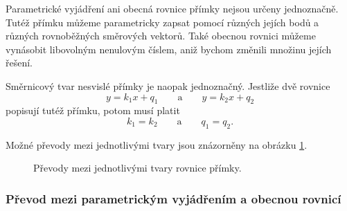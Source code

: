 \begin{remark}\label{rem:Uniqueness_line_forms}
    Parametrické vyjádření ani obecná rovnice přímky nejsou určeny
    jednoznačně. Tutéž přímku můžeme parametricky zapsat pomocí různých
    jejích bodů a různých rovnoběžných směrových vektorů. Také obecnou
    rovnici můžeme vynásobit libovolným nenulovým číslem, aniž bychom
    změnili množinu jejích řešení.

    Směrnicový tvar nesvislé přímky je naopak jednoznačný. Jestliže dvě
    rovnice
    \[
        y=k_1x+q_1
        \qquad\text{a}\qquad
        y=k_2x+q_2
    \]
    popisují tutéž přímku, potom musí platit
    \[
        k_1=k_2
        \qquad\text{a}\qquad
        q_1=q_2.
    \]
\end{remark}

Možné převody mezi jednotlivými tvary jsou znázorněny na obrázku
\ref{fig:Conversions_between_line_forms}.

\begin{figure}[H]
    \centering
    \caption{Převody mezi jednotlivými tvary rovnice přímky.}
    \label{fig:Conversions_between_line_forms}
\end{figure}


\subsubsection{Převod mezi parametrickým vyjádřením a obecnou rovnicí}
\label{subsubsec:Conversion_parametric_general}

